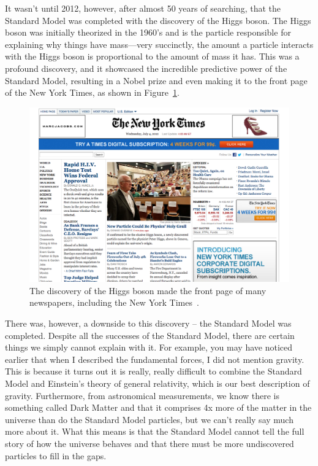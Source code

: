 It wasn't until 2012, however, after almost 50 years of searching, that the Standard Model was completed with the discovery of the Higgs boson.
The Higgs boson was initially theorized in the 1960's and is the particle responsible for explaining why things have mass---very succinctly, the amount a particle interacts with the Higgs boson is proportional to the amount of mass it has.
This was a profound discovery, and it showcased the incredible predictive power of the Standard Model, resulting in a Nobel prize and even making it to the front page of the New York Times, as shown in Figure~\ref{fig:nyt_higgs}.

\begin{figure}[tbp!]
\begin{center}
\includegraphics[angle=0,width=0.60\columnwidth]{fig/nyt_higgs.png}
\end{center}
\caption{The discovery of the Higgs boson made the front page of many newspapers, including the New York Times~\cite{overbye_2012}.}
\label{fig:nyt_higgs}
\end{figure}

There was, however, a downside to this discovery -- the Standard Model was completed.
Despite all the successes of the Standard Model, there are certain things we simply cannot explain with it.
For example, you may have noticed earlier that when I described the fundamental forces, I did not mention gravity.
This is because it turns out it is really, really difficult to combine the Standard Model and Einstein's theory of general relativity, which is our best description of gravity.
Furthermore, from astronomical measurements, we know there is something called Dark Matter and that it comprises 4x more of the matter in the universe than do the Standard Model particles, but we can't really say much more about it.
What this means is that the Standard Model cannot tell the full story of how the universe behaves and that there must be more undiscovered particles to fill in the gaps.

